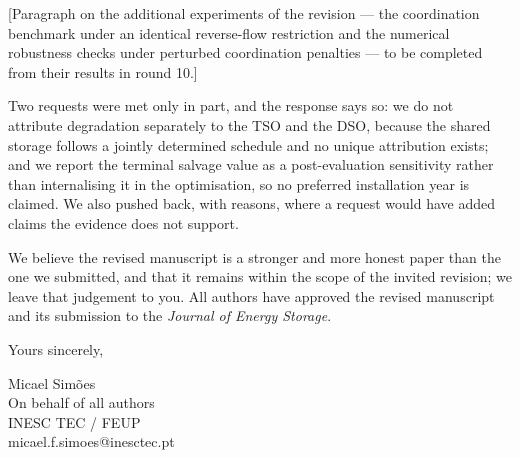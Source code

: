\documentclass[12pt]{letter}
\begin{document}
\begin{letter}{}
    [Paragraph on the additional experiments of the revision --- the coordination benchmark under an identical reverse-flow restriction and the numerical robustness checks under perturbed coordination penalties --- to be completed from their results in round 10.]

    Two requests were met only in part, and the response says so: we do not attribute degradation separately to the TSO and the DSO, because the shared storage follows a jointly determined schedule and no unique attribution exists; and we report the terminal salvage value as a post-evaluation sensitivity rather than internalising it in the optimisation, so no preferred installation year is claimed. We also pushed back, with reasons, where a request would have added claims the evidence does not support.

    We believe the revised manuscript is a stronger and more honest paper than the one we submitted, and that it remains within the scope of the invited revision; we leave that judgement to you. All authors have approved the revised manuscript and its submission to the \textit{Journal of Energy Storage}.

    \closing{Yours sincerely,}
    Micael Simões\\
    On behalf of all authors\\
    INESC TEC / FEUP\\
    micael.f.simoes@inesctec.pt

\end{letter}
\end{document}
